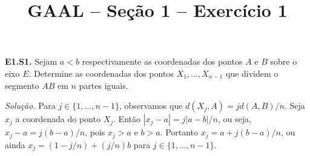 \documentclass[a4paper,11pt]{article}
\title{GAAL -- Seção 1 -- Exercício 1}
\author{\empty}
\date{\empty}
\newcommand\onlyinsubfileone\maketitle
\begin{document}
\onlyinsubfileone

\textbf{E1.S1.}
Sejam $a < b$ respectivamente as coordenadas dos pontos $A$ e $B$ sobre o eixo $E$.
Determine as coordenadas dos pontos $X_1, \dots, X_{n-1}$ que dividem o segmento $AB$ em $n$ partes iguais.

\vspace{\baselineskip}

\emph{Solução.}
Para $j \in \{1, \dots, n-1 \}$, observamos que $d(X_j,A) = j d(A,B)/n$.
Seja $x_j$ a coordenada do ponto $X_j$.
Então $|x_j - a| = j|a-b|/n$, ou seja, $x_j - a = j(b-a)/n$, pois $x_j > a$ e $b > a$.
Portanto $x_j = a + j(b-a)/n$, ou ainda $x_j = (1-j/n) + (j/n)b$ para $j \in \{1, \dots, n-1 \}$.
\end{document}
